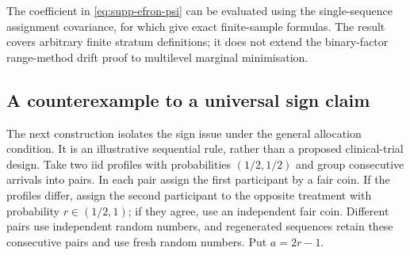 \documentclass[12pt,a4paper]{article}
\theoremstyle{definition}
\theoremstyle{remark}\newtheorem{remark}{Remark}
\numberwithin{equation}{section}
\begin{document}
The coefficient in \eqref{eq:supp-efron-psi} can be evaluated using the single-sequence assignment covariance, for which \citet[Corollary~2.1]{MarkaryanRosenberger2010} give exact finite-sample formulas. The result covers arbitrary finite stratum definitions; it does not extend the binary-factor range-method drift proof to multilevel marginal minimisation.

\subsection{A counterexample to a universal sign claim}\label{sec:supp-sign-counterexample}
The next construction isolates the sign issue under the general allocation condition. It is an illustrative sequential rule, rather than a proposed clinical-trial design. Take two iid profiles with probabilities $(1/2,1/2)$ and group consecutive arrivals into pairs. In each pair assign the first participant by a fair coin. If the profiles differ, assign the second participant to the opposite treatment with probability $r\in(1/2,1)$; if they agree, use an independent fair coin. Different pairs use independent random numbers, and regenerated sequences retain these consecutive pairs and use fresh random numbers. Put $a=2r-1$.
\end{document}
